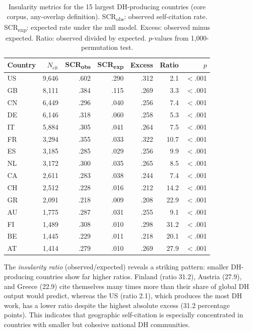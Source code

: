\documentclass[twoside]{article}
\begin{document}
\begin{table}[t]
\center
\small
\begin{tabular}{lrrrrrr}
\toprule
Country & $N_{\mathrm{cit}}$ & SCR\textsubscript{obs} & SCR\textsubscript{exp} & Excess & Ratio & $p$ \\
\midrule
US & 9{,}646 & .602 & .290 & .312 & 2.1 & $<$.001 \\
GB & 8{,}111 & .384 & .115 & .269 & 3.3 & $<$.001 \\
CN & 6{,}449 & .296 & .040 & .256 & 7.4 & $<$.001 \\
DE & 6{,}146 & .318 & .060 & .258 & 5.3 & $<$.001 \\
IT & 5{,}884 & .305 & .041 & .264 & 7.5 & $<$.001 \\
FR & 3{,}294 & .355 & .033 & .322 & 10.7 & $<$.001 \\
ES & 3{,}185 & .285 & .029 & .256 & 9.9 & $<$.001 \\
NL & 3{,}172 & .300 & .035 & .265 & 8.5 & $<$.001 \\
CA & 2{,}611 & .283 & .038 & .244 & 7.4 & $<$.001 \\
CH & 2{,}512 & .228 & .016 & .212 & 14.2 & $<$.001 \\
GR & 2{,}091 & .218 & .009 & .208 & 22.9 & $<$.001 \\
AU & 1{,}775 & .287 & .031 & .255 & 9.1 & $<$.001 \\
FI & 1{,}489 & .308 & .010 & .298 & 31.2 & $<$.001 \\
BE & 1{,}445 & .229 & .011 & .218 & 20.1 & $<$.001 \\
AT & 1{,}414 & .279 & .010 & .269 & 27.9 & $<$.001 \\
\bottomrule
\end{tabular}
\caption{Insularity metrics for the 15 largest DH-producing countries (core corpus, any-overlap definition). SCR\textsubscript{obs}: observed self-citation rate. SCR\textsubscript{exp}: expected rate under the null model. Excess: observed minus expected. Ratio: observed divided by expected. $p$-values from 1{,}000-permutation test.}
\label{tab:countries}
\end{table}

The \textit{insularity ratio} (observed/expected) reveals a striking pattern: smaller DH-producing countries show far higher ratios. Finland (ratio 31.2), Austria (27.9), and Greece (22.9) cite themselves many times more than their share of global DH output would predict, whereas the US (ratio 2.1), which produces the most DH work, has a lower ratio despite the highest absolute excess (31.2 percentage points). This indicates that geographic self-citation is especially concentrated in countries with smaller but cohesive national DH communities.
\end{document}
